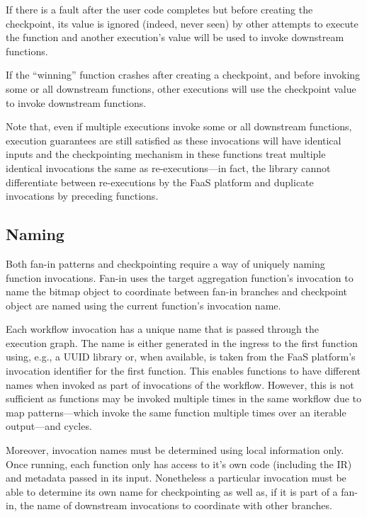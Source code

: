 If there is a fault after the user code completes but before creating the
checkpoint, its value is ignored (indeed, never seen) by other attempts to
execute the function and another execution's value will be used to invoke
downstream functions.

If the ``winning'' function crashes after creating a checkpoint, and before
invoking some or all downstream functions, other executions will use the
checkpoint value to invoke downstream functions.

Note that, even if multiple executions invoke some or all downstream functions,
execution guarantees are still satisfied as these invocations will have
identical inputs and the checkpointing mechanism in these functions treat
multiple identical invocations the same as re-executions---in fact, the \name{}
library cannot differentiate between re-executions by the FaaS platform and
duplicate invocations by preceding functions.

\subsection{Naming}\label{sec:design:naming}

Both fan-in patterns and checkpointing require a way of uniquely naming function
invocations. Fan-in uses the target aggregation function's invocation to name
the bitmap object to coordinate between fan-in branches and checkpoint object
are named using the current function's invocation name.

Each workflow invocation has a unique name that is passed through the execution
graph. The name is either generated in the ingress to the first function using,
e.g., a UUID library or, when available, is taken from the FaaS platform's
invocation identifier for the first function. This enables functions to have
different names when invoked as part of invocations of the workflow. However,
this is not sufficient as functions may be invoked multiple times in the same
workflow due to map patterns---which invoke the same function multiple times over
an iterable output---and cycles.

Moreover, invocation names must be determined using local information only. Once
running, each function only has access to it's own code (including the IR) and
metadata passed in its input. Nonetheless a particular invocation must be able
to determine its own name for checkpointing as well as, if it is part of a
fan-in, the name of downstream invocations to coordinate with other branches.

